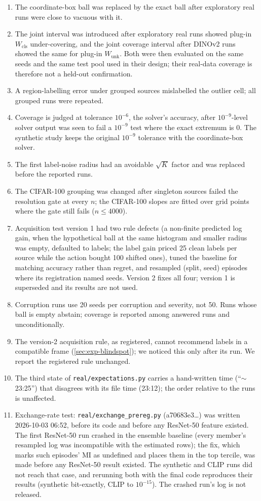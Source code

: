 \documentclass[twoside]{article}
\newcommand{\Wcls}{\ensuremath{W_{\mathrm{cls}}}}
\newcommand{\Wunk}{\ensuremath{W_{\mathrm{unk}}}}
\begin{document}
\begin{enumerate}
\item The coordinate-box ball was replaced by the exact ball after exploratory real runs were close to
vacuous with it.
\item The joint interval was introduced after exploratory real runs showed plug-in $\Wcls$
under-covering, and the joint coverage interval after DINOv2 runs showed the same for plug-in $\Wunk$.
Both were then evaluated on the same seeds and the same test pool used in their design; their real-data
coverage is therefore not a held-out confirmation.
\item A region-labelling error under grouped sources mislabelled the outlier cell; all grouped runs
were repeated.
\item Coverage is judged at tolerance $10^{-6}$, the solver's accuracy, after $10^{-9}$-level solver
output was seen to fail a $10^{-9}$ test where the exact extremum is $0$. The synthetic study keeps the
original $10^{-9}$ tolerance with the coordinate-box solver.
\item The first label-noise radius had an avoidable $\sqrt K$ factor and was replaced before the reported
runs.
\item The CIFAR-100 grouping was changed after singleton sources failed the resolution gate at every
$n$; the CIFAR-100 slopes are fitted over grid points where the gate still fails ($n\le4000$).
\item Acquisition test version 1 had two rule defects (a non-finite predicted log gain, when the
hypothetical ball at the same histogram and smaller radius was empty, defaulted to labels; the label
gain priced 25 clean labels per source while the action bought 100 shifted ones), tuned the baseline
for matching accuracy rather than regret, and resampled (split, seed) episodes where its registration
named seeds. Version 2 fixes all four; version 1 is superseded and its results are not used.
\item Corruption runs use 20 seeds per corruption and severity, not 50. Runs whose ball is empty
abstain; coverage is reported among answered runs and unconditionally.
\item The version-2 acquisition rule, as registered, cannot recommend labels in a compatible frame
(\cref{sec:exp-blindspot}); we noticed this only after its run. We report the registered rule unchanged.
\item The third state of \texttt{real/expectations.py} carries a hand-written time (``$\sim$23:25'') that
disagrees with its file time (23:12); the order relative to the runs is unaffected.
\item Exchange-rate test: \texttt{real/exchange\_prereg.py} (a70683e3\ldots) was written 2026-10-03 06:52,
before its code and before any ResNet-50 feature existed. The first ResNet-50 run crashed in the ensemble
baseline (every member's resampled log was incompatible with the estimated rows); the fix, which marks
such episodes' MI as undefined and places them in the top tercile, was made before any ResNet-50 result
existed. The synthetic and CLIP runs did not reach that case, and rerunning both with the final code
reproduces their results (synthetic bit-exactly, CLIP to $10^{-15}$). The crashed run's log is not
released.
\end{enumerate}
\end{document}
